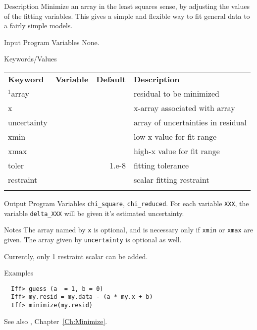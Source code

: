 \begin{IFFcom}
\item[Description] Minimize an array in the least squares sense, by
  adjusting the values of the fitting variables.  This gives a simple and
  flexible way to fit general data to a fairly simple models.
\item[Input Program Variables] None.
\item[Keywords/Values] 
  {\relax \hspace{1.1truein}\par\noindent\relax}
  \begin{tabular}{llrl}
  \textbf{Keyword} & \textbf{Variable} & \textbf{Default} &
  \textbf{Description}\\
  \noalign{\smallskip}
    ${}^{1}${array}  & & & {residual to be minimized} \\ 
    {x}              & & & {x-array associated with array} \\ 
    {uncertainty}    & & & {array of uncertainties in residual} \\ 
    {xmin}           & & & {low-x  value for fit range} \\ 
    {xmax}           & & & {high-x value for fit range} \\ 
    {toler}          & & 1.e-8 & {fitting tolerance} \\ 
    {restraint}      & & & {scalar fitting restraint} \\ 
    \noalign{\smallskip}
  \end{tabular}
  \noindent
     
\item[Output Program Variables]  {\tt{chi\_square}}, {\tt{chi\_reduced}}.
  For each variable {\tt{XXX}}, the variable {\tt{delta\_XXX}} will be
  given it's estimated uncertainty.
\item[Notes] The array named by {\tt{x}} is optional, and is necessary only
  if {\tt{xmin}} or {\tt{xmax}} are given.  The array given by
  {\tt{uncertainty}} is optional as well.

  Currently, only 1 restraint scalar can be added.

\item[Examples] {\hspace{1.in} \vspace{-0.1truein} \relax }
\begin{verbatim} 
  Iff> guess (a  = 1, b = 0)
  Iff> my.resid = my.data - (a * my.x + b)
  Iff> minimize(my.resid)
\end{verbatim} \noindent %
\item[See also] {}, Chapter~{\ref{Ch:Minimize}}. 
\end{IFFcom}


